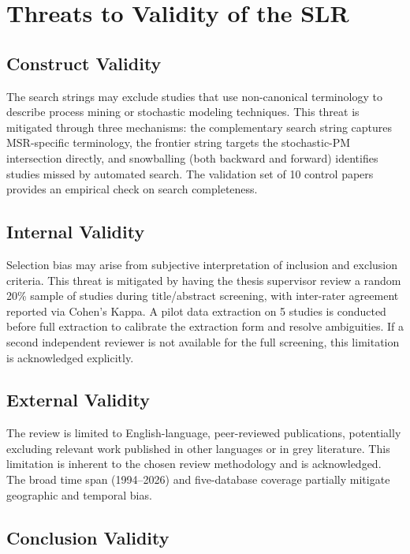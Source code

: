 \section{Threats to Validity of the SLR}
\label{sec:slr-threats}

\subsection{Construct Validity}

The search strings may exclude studies that use non-canonical terminology to describe process mining or stochastic modeling techniques. This threat is mitigated through three mechanisms: the complementary search string captures MSR-specific terminology, the frontier string targets the stochastic-PM intersection directly, and snowballing (both backward and forward) identifies studies missed by automated search. The validation set of 10 control papers provides an empirical check on search completeness.

\subsection{Internal Validity}

Selection bias may arise from subjective interpretation of inclusion and exclusion criteria. This threat is mitigated by having the thesis supervisor review a random 20\% sample of studies during title/abstract screening, with inter-rater agreement reported via Cohen's Kappa. A pilot data extraction on 5 studies is conducted before full extraction to calibrate the extraction form and resolve ambiguities. If a second independent reviewer is not available for the full screening, this limitation is acknowledged explicitly.

\subsection{External Validity}

The review is limited to English-language, peer-reviewed publications, potentially excluding relevant work published in other languages or in grey literature. This limitation is inherent to the chosen review methodology and is acknowledged. The broad time span (1994--2026) and five-database coverage partially mitigate geographic and temporal bias.

\subsection{Conclusion Validity}

